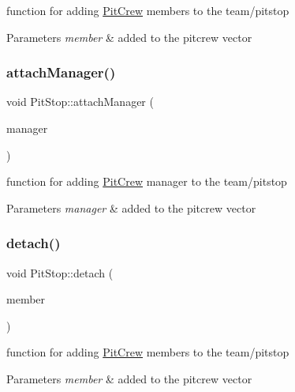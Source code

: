 function for adding \mbox{\hyperlink{class_pit_crew}{Pit\+Crew}} members to the team/pitstop 
\begin{DoxyParams}{Parameters}
{\em member} & added to the pitcrew vector \\
\hline
\end{DoxyParams}
\mbox{\label{class_pit_stop_a5c92a9c5a3f6433c84d94f4eb612dfaf}} 
\subsubsection{\texorpdfstring{attach\+Manager()}{attachManager()}}
{\footnotesize\ttfamily void Pit\+Stop\+::attach\+Manager (\begin{DoxyParamCaption}\item[{\mbox{\hyperlink{class_pit_crew}{Pit\+Crew}} $\ast$}]{manager }\end{DoxyParamCaption})}

function for adding \mbox{\hyperlink{class_pit_crew}{Pit\+Crew}} manager to the team/pitstop 
\begin{DoxyParams}{Parameters}
{\em manager} & added to the pitcrew vector \\
\hline
\end{DoxyParams}
\mbox{\label{class_pit_stop_a08037efd617a3f0f36a7a69537ba2a49}} 
\subsubsection{\texorpdfstring{detach()}{detach()}}
{\footnotesize\ttfamily void Pit\+Stop\+::detach (\begin{DoxyParamCaption}\item[{\mbox{\hyperlink{class_pit_crew}{Pit\+Crew}} $\ast$}]{member }\end{DoxyParamCaption})}

function for adding \mbox{\hyperlink{class_pit_crew}{Pit\+Crew}} members to the team/pitstop 
\begin{DoxyParams}{Parameters}
{\em member} & added to the pitcrew vector \\
\hline
\end{DoxyParams}
\mbox{\label{class_pit_stop_afe4eca8318260d7399f5f8c29288dc02}} 
